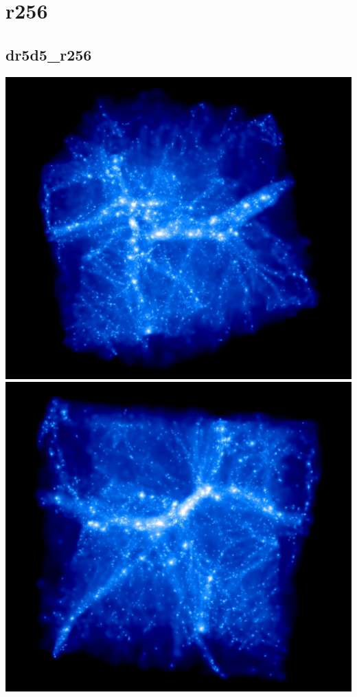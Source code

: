 \section{r256} 

\subsection{dr5d5\_r256}
\includegraphics[scale=0.12]{r256/dr5d5_r256/rotate_00188.jpg} 
\includegraphics[scale=0.12]{r256/dr5d5_r256/rotate_00320.jpg} \\

